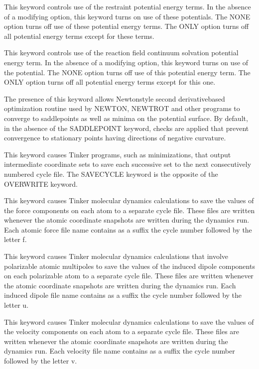 \documentclass[letterpaper,11pt,english]{sphinxmanual}
\begin{document}
  This keyword controls use of the restraint potential energy terms. In the absence of a modifying option, this keyword turns on use of these potentials. The NONE option turns off use of these potential energy terms. The ONLY option turns off all potential energy terms except for these terms.

  This keyword controls use of the reaction field continuum solvation potential energy term. In the absence of a modifying option, this keyword turns on use of the potential. The NONE option turns off use of this potential energy term. The ONLY option turns off all potential energy terms except for this one.

  The presence of this keyword allows Newton\sphinxhyphen{}style second derivative\sphinxhyphen{}based optimization routine used by NEWTON, NEWTROT and other programs to converge to saddlepoints as well as minima on the potential surface. By default, in the absence of the SADDLEPOINT keyword, checks are applied that prevent convergence to stationary points having directions of negative curvature.

  This keyword causes Tinker programs, such as minimizations, that output intermediate coordinate sets to save each successive set to the next consecutively numbered cycle file. The SAVE\sphinxhyphen{}CYCLE keyword is the opposite of the OVERWRITE keyword.

  This keyword causes Tinker molecular dynamics calculations to save the values of the force components on each atom to a separate cycle file. These files are written whenever the atomic coordinate snapshots are written during the dynamics run. Each atomic force file name contains as a suffix the cycle number followed by the letter f.

  This keyword causes Tinker molecular dynamics calculations that involve polarizable atomic multipoles to save the values of the induced dipole components on each polarizable atom to a separate cycle file. These files are written whenever the atomic coordinate snapshots are written during the dynamics run. Each induced dipole file name contains as a suffix the cycle number followed by the letter u.

  This keyword causes Tinker molecular dynamics calculations to save the values of the velocity components on each atom to a separate cycle file. These files are written whenever the atomic coordinate snapshots are written during the dynamics run. Each velocity file name contains as a suffix the cycle number followed by the letter v.
\end{document}
